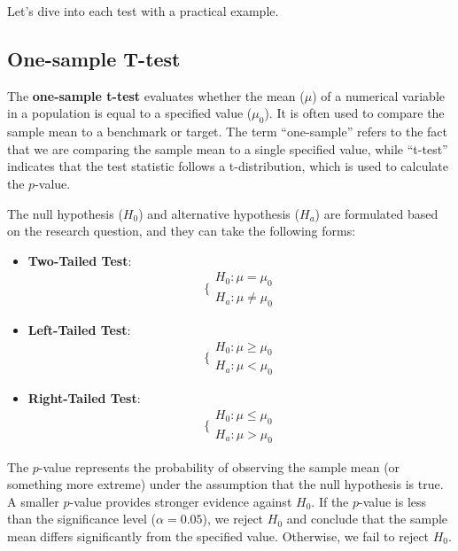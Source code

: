 \documentclass[
]{book}
\providecommand{\tightlist}{%
  \setlength{\itemsep}{0pt}\setlength{\parskip}{0pt}}
\theoremstyle{definition}
\theoremstyle{definition}
\theoremstyle{definition}
\theoremstyle{definition}
\theoremstyle{remark}
\begin{document}
Let's dive into each test with a practical example.

\subsection{One-sample T-test}\label{one-sample-t-test}

The \textbf{one-sample t-test} evaluates whether the mean (\(\mu\)) of a numerical variable in a population is equal to a specified value (\(\mu_0\)). It is often used to compare the sample mean to a benchmark or target. The term ``one-sample'' refers to the fact that we are comparing the sample mean to a single specified value, while ``t-test'' indicates that the test statistic follows a t-distribution, which is used to calculate the \(p\)-value.

The null hypothesis (\(H_0\)) and alternative hypothesis (\(H_a\)) are formulated based on the research question, and they can take the following forms:

\begin{itemize}
\tightlist
\item
  \textbf{Two-Tailed Test}:
  \[
  \bigg\{
  \begin{matrix}
          H_0:  \mu   =  \mu_0 \\
          H_a:  \mu \neq \mu_0
  \end{matrix}
  \]
\item
  \textbf{Left-Tailed Test}:
  \[
  \bigg\{
  \begin{matrix}
          H_0:  \mu \geq \mu_0 \\
          H_a:  \mu  <   \mu_0
  \end{matrix}
  \]
\item
  \textbf{Right-Tailed Test}:
  \[
  \bigg\{
  \begin{matrix}
          H_0:  \mu \leq \mu_0 \\
          H_a:  \mu >   \mu_0
  \end{matrix}
  \]
\end{itemize}

The \(p\)-value represents the probability of observing the sample mean (or something more extreme) under the assumption that the null hypothesis is true. A smaller \(p\)-value provides stronger evidence against \(H_0\). If the \(p\)-value is less than the significance level (\(\alpha = 0.05\)), we reject \(H_0\) and conclude that the sample mean differs significantly from the specified value. Otherwise, we fail to reject \(H_0\).
\end{document}
